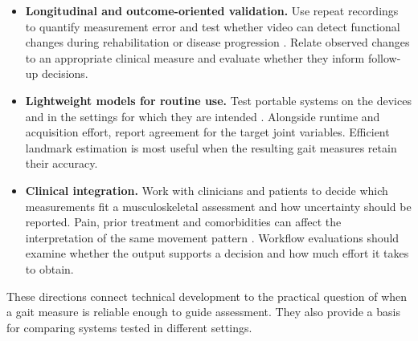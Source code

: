 \begin{revision}
\begin{itemize}
    \item \textbf{Longitudinal and outcome-oriented validation.}
    Use repeat recordings to quantify measurement error and test whether video can detect functional changes during rehabilitation or disease progression \cite{gaudreault2011effects,bkaczkowicz2018gait,stenum2024clinical}. Relate observed changes to an appropriate clinical measure and evaluate whether they inform follow-up decisions.

    \item \textbf{Lightweight models for routine use.}
    Test portable systems on the devices and in the settings for which they are intended \cite{li2020human,uccheddu2022rgb,yan2025efficient}. Alongside runtime and acquisition effort, report agreement for the target joint variables. Efficient landmark estimation is most useful when the resulting gait measures retain their accuracy.

    \item \textbf{Clinical integration.}
    Work with clinicians and patients to decide which measurements fit a musculoskeletal assessment and how uncertainty should be reported. Pain, prior treatment and comorbidities can affect the interpretation of the same movement pattern \cite{hertling2006management,lu2026musculoskeletal,pandey2022movement}. Workflow evaluations should examine whether the output supports a decision and how much effort it takes to obtain.
\end{itemize}

These directions connect technical development to the practical question of when a gait measure is reliable enough to guide assessment. They also provide a basis for comparing systems tested in different settings.
\end{revision}

